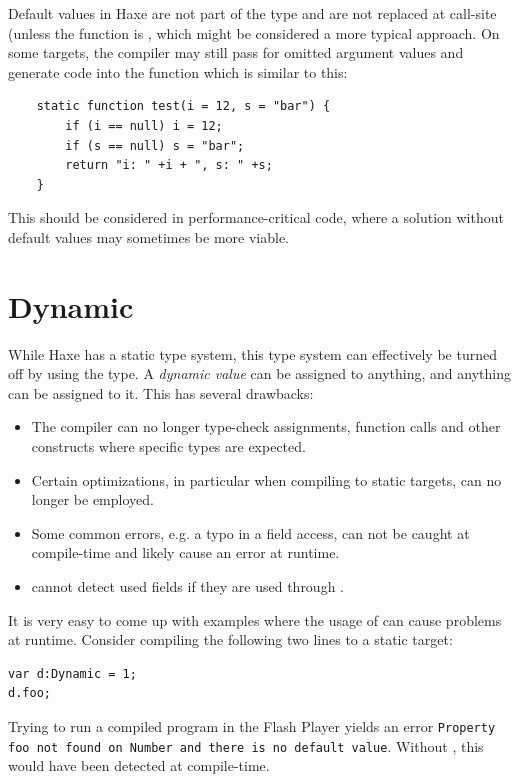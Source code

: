 \documentclass{haxe}
\begin{document}

Default values in Haxe are not part of the type and are not replaced at call-site (unless the function is , which might be considered a more typical approach. On some targets, the compiler may still pass  for omitted argument values and generate code into the function which is similar to this:
\begin{lstlisting}
	static function test(i = 12, s = "bar") {
		if (i == null) i = 12;
		if (s == null) s = "bar";
		return "i: " +i + ", s: " +s;
	}
\end{lstlisting}
This should be considered in performance-critical code, where a solution without default values may sometimes be more viable.




\section{Dynamic}
\label{types-dynamic}

While Haxe has a static type system, this type system can effectively be turned off by using the  type. A \emph{dynamic value} can be assigned to anything, and anything can be assigned to it. This has several drawbacks:

\begin{itemize}
	\item The compiler can no longer type-check assignments, function calls and other constructs where specific types are expected.
	\item Certain optimizations, in particular when compiling to static targets, can no longer be employed.
	\item Some common errors, e.g. a typo in a field access, can not be caught at compile-time and likely cause an error at runtime.
	\item {} cannot detect used fields if they are used through .
\end{itemize}
It is very easy to come up with examples where the usage of  can cause problems at runtime. Consider compiling the following two lines to a static target:

\begin{lstlisting}
var d:Dynamic = 1;
d.foo;
\end{lstlisting}
Trying to run a compiled program in the Flash Player yields an error \texttt{Property foo not found on Number and there is no default value}. Without , this would have been detected at compile-time.
\end{document}
